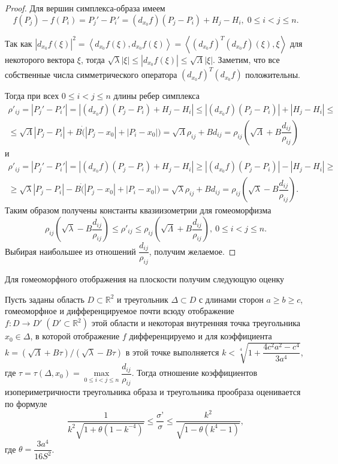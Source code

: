 \documentclass[a4paper,11pt,twoside]{article}
\begin{document}
\begin{proof}
Для вершин симплекса-образа имеем 
$$ f(P_j)-f(P_i)= P_j' - P_i' = (d_{x_0}f)(P_j-P_i)+H_j-H_i, \; 0 \leqslant i < j \leqslant n. $$
		
Так как $| d_{x_0}f(\xi)|^2=\left\langle d_{x_0}f(\xi),
d_{x_0}f(\xi)\right\rangle  = \left\langle (d_{x_0}f)^T
(d_{x_0}f)(\xi), \xi\right\rangle$ для некоторого вектора $ \xi $, тогда
$ \sqrt{\lambda} |\xi| \leqslant | d_{x_0}f(\xi)| \leqslant \sqrt{\Lambda} |\xi|$. Заметим, что все собственные числа симметрического оператора $ (d_{x_0}f)^T (d_{x_0}f)$ положительны.
		
Тогда при всех $0 \leqslant i < j \leqslant n$ длины ребер симплекса
\begin{multline*}
\rho'_{ij}=| P_j' - P_i' |= |(d_{x_0}f)(P_j-P_i)+H_j-H_i| \leqslant |(d_{x_0}f)(P_j-P_i)|+|H_j-H_i| \leqslant \\ \leqslant \sqrt{\Lambda}|P_j-P_i|+ B \dot (|P_j-x_0|+|P_i-x_0|) =\sqrt{\Lambda} \rho_{ij}+ B d_{ij}
= \rho_{ij} \left(\sqrt{\Lambda}+ B \dfrac{d_{ij}}{\rho_{ij}}\right)
\end{multline*} 
и
\begin{multline*}
\rho'_{ij}=| P_j' - P_i' |= |(d_{x_0}f)(P_j-P_i)+H_j-H_i| \geqslant |(d_{x_0}f)(P_j-P_i)|-|H_j-H_i| \geqslant \\ \geqslant \sqrt{\lambda}|P_j-P_i|- B \dot (|P_j-x_0|+|P_i-x_0|) =\sqrt{\lambda} \rho_{ij}+ B d_{ij}=\rho_{ij} \left(\sqrt{\lambda}- B \dfrac{d_{ij}}{\rho_{ij}}\right).
\end{multline*} 
Таким образом получены константы квазиизометрии для гомеоморфизма
$$\rho_{ij} \left(\sqrt{\lambda}- B \dfrac{d_{ij}}{\rho_{ij}}\right) \leqslant	\rho'_{ij}\leqslant \rho_{ij} \left(\sqrt{\Lambda}+ B \dfrac{d_{ij}}{\rho_{ij}}\right), \: 0 \leqslant i < j \leqslant n.$$
Выбирая наибольшее из отношений $\dfrac{d_{ij}}{\rho_{ij}}$, получим желаемое.
\end{proof}
	
Для гомеоморфного отображения на плоскости получим следующую оценку 
\begin{crl}
	Пусть заданы область $ D \subset \mathbb{R}^2$ и треугольник $ \Delta \subset D $ с длинами сторон $a \geqslant b \geqslant c$, гомеоморфное и дифференцируемое почти всюду отображение $ f:D\rightarrow D' \; ( D' \subset \mathbb{R}^2)$ этой области и некоторая внутренняя точка треугольника $ x_0 \in \Delta $, в которой отображение $f$ дифференцируемо и для коэффициента $k=\left(\sqrt{\Lambda}+ B \tau \right) / \left(\sqrt{\lambda}- B \tau \right)$ в этой точке выполняется  $k<\sqrt[4]{1+\dfrac{4c^2a^2-c^4}{3a^4}}$, где $\tau=\tau(\Delta, x_0)=\max\limits_{0 \leqslant i < j \leqslant n}\dfrac{d_{ij}}{\rho_{ij}}$. 
	Тогда отношение коэффициентов изопериметричности треугольника образа и треугольника прообраза оценивается по формуле 
	\begin{equation} 
	\dfrac{1}{k^2\sqrt{1+ \theta \left(1-k^{-4} \right)}} \leqslant \dfrac{\sigma’}{\sigma} 
	\leqslant \dfrac{k^2 }{\sqrt{1- \theta (k^4-1)}}, \label{Shurk-gomR2}
	\end{equation}
	где $\theta = \dfrac{3 a^4}{16S^2}$.
\end{crl}
	
\end{document}
